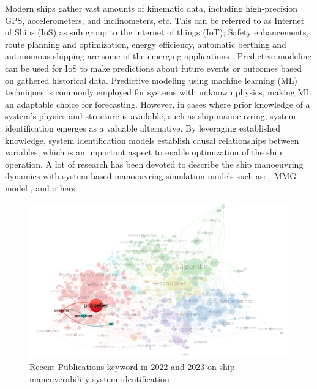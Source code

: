 Modern ships gather vast amounts of kinematic data, including high-precision GPS, accelerometers, and inclinometers, etc. This can be referred to as Internet of Ships (IoS) \citep{liu_internet_2016} as sub group to the internet of things (IoT); Safety enhancements, route planning and optimization, energy efficiency, automatic berthing and autonomous shipping are some of the emerging applications \citep{aslam_internet_2020}.
Predictive modeling can be used for IoS to make predictions about future events or outcomes based on gathered historical data.
Predictive modeling using machine learning (ML) techniques is commonly employed for systems with unknown physics, making ML an adaptable choice for forecasting. However, in cases where prior knowledge of a system's physics and structure is available, such as ship manoeuvring, system identification emerges as a valuable alternative. By leveraging established knowledge, system identification models establish causal relationships between variables, which is an important aspect to enable optimization of the ship operation.
A lot of research has been devoted to describe the ship manoeuvring dynamics with system based manoeuvring simulation models such as: \citet{abkowitz_ship_1964,nomoto_steering_1957,norrbin_theory_1971}, MMG model \citep{yasukawa_introduction_2015}, and others.

\begin{figure}[h!]
  \includegraphics[width=.8\textwidth]{figures/wind_drift_research.png}
  \caption{Recent Publications keyword in 2022 and 2023 on ship maneuverability system identification}
  \label{fig:pub_overview}
\end{figure}

